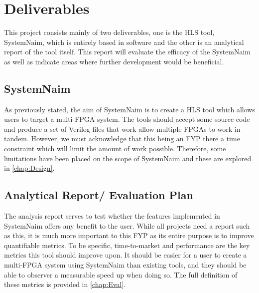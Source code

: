 \section{Deliverables}

This project consists mainly of two deliverables, one is the HLS tool, SystemNaim, which is entirely based in software and the other is an analytical report of the tool itself. This report will evaluate the efficacy of the SystemNaim as well as indicate areas where further development would be beneficial.

\subsection{SystemNaim}

As previously stated, the aim of SystemNaim is to create a HLS tool which allows users to target a multi-FPGA system. The tools should accept some source code and produce a set of Verilog files that work allow multiple FPGAs to work in tandem. However, we must acknowledge that this being an FYP there a time constraint which will limit the amount of work possible. Therefore, some limitations have been placed on the scope of SystemNaim and these are explored in \autoref{chap:Design}. 

\subsection{Analytical Report/ Evaluation Plan}
\label{subsec:eval_plan}

The analysis report serves to test whether the features implemented in SystemNaim offers any benefit to the user. While all projects need a report such as this, it is much more important to this FYP as its entire purpose is to improve quantifiable metrics. To be specific, time-to-market and performance are the key metrics this tool should improve upon. It should be easier for a user to create a multi-FPGA system using SystemNaim than existing tools, and they should be able to observer a measurable speed up when doing so. The full definition of these metrics is provided in \autoref{chap:Eval}.





